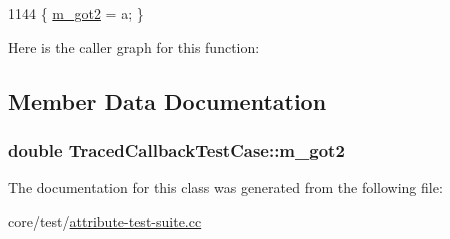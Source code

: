 \begin{DoxyCode}
1144 \{ \hyperlink{classTracedCallbackTestCase_a3a69dac6a5b1b0cf2828f5c3969c3a38}{m\_got2} = a; \}
\end{DoxyCode}


Here is the caller graph for this function\+:




\subsection{Member Data Documentation}
\subsubsection[{\texorpdfstring{m\+\_\+got2}{m_got2}}]{\setlength{\rightskip}{0pt plus 5cm}double Traced\+Callback\+Test\+Case\+::m\+\_\+got2\hspace{0.3cm}{\ttfamily [private]}}\hypertarget{classTracedCallbackTestCase_a3a69dac6a5b1b0cf2828f5c3969c3a38}{}\label{classTracedCallbackTestCase_a3a69dac6a5b1b0cf2828f5c3969c3a38}


The documentation for this class was generated from the following file\+:\begin{DoxyCompactItemize}
\item 
core/test/\hyperlink{attribute-test-suite_8cc}{attribute-\/test-\/suite.\+cc}\end{DoxyCompactItemize}
